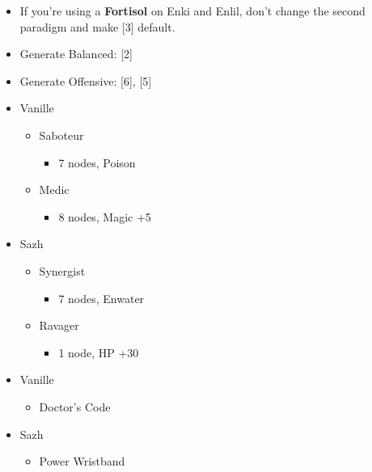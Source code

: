 \begin{menu}
		\begin{itemize}
			\paradigm
			\begin{itemize}
				\item If you're using a \textbf{Fortisol} on Enki and Enlil, don't change the second paradigm and  make [3] default.
				\item Generate Balanced: [2]
				\item Generate Offensive: [6], [5]
			\end{itemize}
			\crystarium
			\begin{itemize}
				\item Vanille
				      \begin{itemize}
					      \item Saboteur
					            \begin{itemize}
						            \item 7 nodes, Poison
					            \end{itemize}
					      \item Medic
					            \begin{itemize}
						            \item 8 nodes, Magic +5
					            \end{itemize}
				      \end{itemize}
				\item Sazh
				      \begin{itemize}
					      \item Synergist
					            \begin{itemize}
						            \item 7 nodes, Enwater
					            \end{itemize}
					      \item Ravager
					            \begin{itemize}
						            \item 1 node, HP +30
					            \end{itemize}
				      \end{itemize}
			\end{itemize}
			\equip
			\begin{itemize}
				\item Vanille
				      \begin{itemize}
					      \item Doctor's Code
				      \end{itemize}
				\item Sazh
				      \begin{itemize}
					      \item Power Wristband
				      \end{itemize}
			\end{itemize}
		\end{itemize}
\end{menu}

